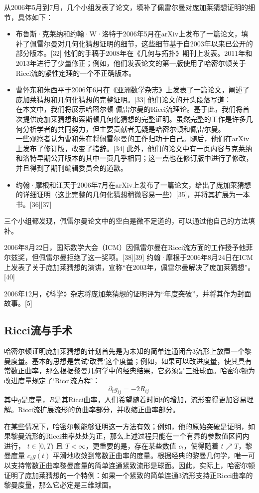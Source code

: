 从2006年5月到7月，几个小组发表了论文，填补了佩雷尔曼对庞加莱猜想证明的细节，具体如下：
\begin{itemize}
\item 布鲁斯·克莱纳和约翰·W·洛特于2006年5月在arXiv上发布了一篇论文，填补了佩雷尔曼对几何化猜想证明的细节，这些细节基于自2003年以来已公开的部分版本。[32] 他们的手稿于2008年在《几何与拓扑》期刊上发表。2011年和2013年进行了少量修正；例如，他们发表论文的第一版使用了哈密尔顿关于Ricci流的紧性定理的一个不正确版本。
\item 曹怀东和朱西平于2006年6月在《亚洲数学杂志》上发表了一篇论文，阐述了庞加莱猜想和几何化猜想的完整证明。[33] 他们论文的开头段落写道：\\
在本文中，我们将展示哈密尔顿-佩雷尔曼的Ricci流理论。基于此，我们将首次提供庞加莱猜想和索斯顿几何化猜想的完整证明。虽然完整的工作是许多几何分析学者的共同努力，但主要贡献者无疑是哈密尔顿和佩雷尔曼。\\
一些观察者认为曹和朱在将佩雷尔曼的工作归功于自己。随后，他们在arXiv上发布了修订版，改变了措辞。[34] 此外，他们的论文中有一页内容与克莱纳和洛特早期公开版本的其中一页几乎相同；这一点也在修订版中进行了修改，并且得到了期刊编辑委员会的道歉。\\
\item 约翰·摩根和江天于2006年7月在arXiv上发布了一篇论文，给出了庞加莱猜想的详细证明（这比完整的几何化猜想稍微容易一些）[35]，并将其扩展为一本书。[36][37]
\end{itemize}
三个小组都发现，佩雷尔曼论文中的空白是微不足道的，可以通过他自己的方法填补。

2006年8月22日，国际数学大会（ICM）因佩雷尔曼在Ricci流方面的工作授予他菲尔兹奖，但佩雷尔曼拒绝了这一奖项。[38][39] 约翰·摩根于2006年8月24日在ICM上发表了关于庞加莱猜想的演讲，宣称“在2003年，佩雷尔曼解决了庞加莱猜想”。[40]

2006年12月，《科学》杂志将庞加莱猜想的证明评为“年度突破”，并将其作为封面故事。[5]
\subsection{Ricci流与手术}  
哈密尔顿证明庞加莱猜想的计划首先是为未知的简单连通闭合3流形上放置一个黎曼度量。基本的思想是尝试‘改善’这个度量；例如，如果可以改进度量，使其具有常数正曲率，那么根据黎曼几何学中的经典结果，它必须是三维球面。哈密尔顿为改进度量规定了‘Ricci流方程’：
\[
\partial_t g_{ij} = -2 R_{ij}~
\]
其中\(g\)是度量，\(R\)是其Ricci曲率，人们希望随着时间\(t\)的增加，流形变得更加容易理解。Ricci流扩展流形的负曲率部分，并收缩正曲率部分。

在某些情况下，哈密尔顿能够证明这一方法有效；例如，他的原始突破是证明，如果黎曼流形的Ricci曲率处处为正，那么上述过程只能在一个有界的参数值区间内进行，  
\( t \in [0,T) \) 且 \( T < \infty \)，更重要的是，存在某些数值 \( c_t \)，使得随着 \( t \nearrow T \)，黎曼度量 \( c_t g(t) \) 平滑地收敛到常数正曲率的度量。根据经典的黎曼几何学，唯一可以支持常数正曲率黎曼度量的简单连通紧致流形是球面。因此，实际上，哈密尔顿证明了庞加莱猜想的一个特例：如果一个紧致的简单连通3流形支持正Ricci曲率的黎曼度量，那么它必定是三维球面。

